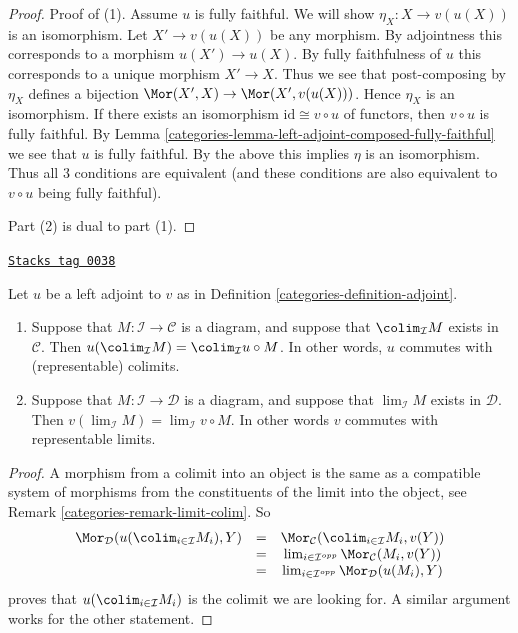 \begin{proof}

Proof of (1).
Assume $u$ is fully faithful. We will show $\eta_X : X \to v(u(X))$
is an isomorphism. Let $X' \to v(u(X))$ be any morphism.
By adjointness this corresponds to a morphism $u(X') \to u(X)$. By fully
faithfulness of $u$ this corresponds to a unique morphism $X' \to X$.
Thus we see that post-composing by $\eta_X$ defines a bijection
$\Mor(X', X) \to \Mor(X', v(u(X)))$. Hence $\eta_X$ is an isomorphism.
If there exists an isomorphism $\text{id} \cong v \circ u$ of functors,
then $v \circ u$ is fully faithful. By
Lemma \ref{categories-lemma-left-adjoint-composed-fully-faithful} we see
that $u$ is fully faithful. By the above this implies $\eta$
is an isomorphism. Thus all $3$ conditions are equivalent (and these
conditions are also equivalent to $v \circ u$ being fully faithful).

\medskip\noindent
Part (2) is dual to part (1).
\end{proof}

\begin{lemma}
\label{categories-lemma-adjoint-exact}
\href{https://stacks.math.columbia.edu/tag/0038}{\texttt{Stacks tag 0038}}

Let $u$ be a left adjoint to $v$ as in Definition \ref{categories-definition-adjoint}.
\begin{enumerate}
\item Suppose that $M : \mathcal{I} \to \mathcal{C}$ is a diagram,
and suppose that $\colim_\mathcal{I} M$ exists in
$\mathcal{C}$. Then $u(\colim_\mathcal{I} M) =
\colim_\mathcal{I} u \circ M$. In other words,
$u$ commutes with (representable) colimits.
\item Suppose that $M : \mathcal{I} \to \mathcal{D}$ is a diagram,
and suppose that $\lim_\mathcal{I} M$ exists in
$\mathcal{D}$. Then $v(\lim_\mathcal{I} M) =
\lim_\mathcal{I} v \circ M$. In other words $v$ commutes
with representable limits.
\end{enumerate}
\end{lemma}

\begin{proof}

A morphism from a colimit into an object is the same as a compatible
system of morphisms from the constituents of the limit into the
object, see Remark \ref{categories-remark-limit-colim}. So
$$
\begin{matrix}
\Mor_\mathcal{D}(u(\colim_{i \in \mathcal{I}} M_i), Y) &
= & \Mor_\mathcal{C}(\colim_{i \in \mathcal{I}} M_i, v(Y)) \\
& = &
\lim_{i \in \mathcal{I}^{opp}}
\Mor_\mathcal{C}(M_i, v(Y)) \\
& = &
\lim_{i \in \mathcal{I}^{opp}}
\Mor_\mathcal{D}(u(M_i), Y)
\end{matrix}
$$
proves that $u(\colim_{i \in \mathcal{I}} M_i)$ is
the colimit we are looking for.
A similar argument works for the other statement.
\end{proof}

